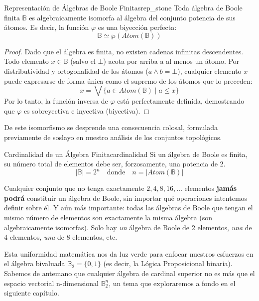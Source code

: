 \begin{teorema}{Representación de Álgebras de Boole Finitas}{rep_stone}
Toda álgebra de Boole finita $\mathbb{B}$ es algebraicamente isomorfa al álgebra del conjunto potencia de sus átomos. Es decir, la función $\varphi$ es una biyección perfecta:
\[ \mathbb{B} \simeq \wp(\mathit{Atom}(\mathbb{B})) \]
\end{teorema}
\begin{proof}
Dado que el álgebra es finita, no existen cadenas infinitas descendentes. Todo elemento $x \in \mathbb{B}$ (salvo el $\bot$) acota por arriba a al menos un átomo. Por distributividad y ortogonalidad de los átomos ($a \wedge b = \bot$), cualquier elemento $x$ puede expresarse de forma única como el supremo de los átomos que lo preceden: 
\[ x = \bigvee \{ a \in \mathit{Atom}(\mathbb{B}) \mid a \le x \} \]
Por lo tanto, la función inversa de $\varphi$ está perfectamente definida, demostrando que $\varphi$ es sobreyectiva e inyectiva (biyectiva).
\end{proof}

De este isomorfismo se desprende una consecuencia colosal, formulada previamente de soslayo en nuestro análisis de los conjuntos topológicos.

\begin{teorema}{Cardinalidad de un Álgebra Finita}{cardinalidad}
Si un álgebra de Boole es finita, su número total de elementos debe ser, forzosamente, una potencia de 2.
\[ |\mathbb{B}| = 2^n \quad \text{donde} \quad n = |\mathit{Atom}(\mathbb{B})| \]
\end{teorema}

Cualquier conjunto que no tenga exactamente $2, 4, 8, 16, \ldots$ elementos \textbf{jamás podrá} constituir un álgebra de Boole, sin importar qué operaciones intentemos definir sobre él. Y aún más importante: todas las álgebras de Boole que tengan el mismo número de elementos son exactamente la misma álgebra (son algebraicamente isomorfas). Solo hay \textit{un} álgebra de Boole de 2 elementos, \textit{una} de 4 elementos, \textit{una} de 8 elementos, etc.

Esta uniformidad matemática nos da luz verde para enfocar nuestros esfuerzos en el álgebra bivaluada $\mathbb{B}_2 = \{0, 1\}$ (es decir, la Lógica Proposicional binaria). Sabemos de antemano que cualquier álgebra de cardinal superior no es más que el espacio vectorial n-dimensional $\mathbb{B}_2^n$, un tema que exploraremos a fondo en el siguiente capítulo.
